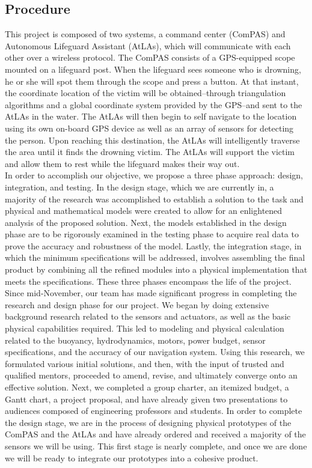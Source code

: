 \documentclass[11pt]{article}
\begin{document}
\subsection*{Procedure}
This project is composed of two systems, a command center (ComPAS) and Autonomous Lifeguard Assistant (AtLAs), which will communicate with each other over a wireless protocol. The ComPAS consists of a GPS-equipped scope mounted on a lifeguard post. When the lifeguard sees someone who is drowning, he or she will spot them through the scope and press a button. At that instant, the coordinate location of the victim will be obtained--through triangulation algorithms and a global coordinate system provided by the GPS--and sent to the AtLAs in the water. The AtLAs will then begin to self navigate to the location using its own on-board GPS device as well as an array of sensors for detecting the person. Upon reaching this destination, the AtLAs will intelligently traverse the area until it finds the drowning victim. The AtLAs will support the victim and allow them to rest while the lifeguard makes their way out.\\

In order to accomplish our objective, we propose a three phase approach: design, integration, and testing. In the design stage, which we are currently in, a majority of the research was accomplished to establish a solution to the task and physical and mathematical models were created to allow for an enlightened analysis of the proposed solution. Next, the models established in the design phase are to be rigorously examined in the testing phase to acquire real data to prove the accuracy and robustness of the model. Lastly, the integration stage, in which the minimum specifications will be addressed, involves assembling the final product by combining all the refined modules into a physical implementation that meets the specifications. These three phases encompass the life of the project. \\

Since mid-November, our team has made significant progress in completing the research and design phase for our project. We began by doing extensive background research related to the sensors and actuators, as well as the basic physical capabilities required. This led to modeling and physical calculation related to the buoyancy, hydrodynamics, motors, power budget, sensor specifications, and the accuracy of our navigation system. Using this research, we formulated various initial solutions, and then, with the input of trusted and qualified mentors, proceeded to amend, revise, and ultimately converge onto an effective solution. Next, we completed a group charter, an itemized budget, a Gantt chart, a project proposal, and have already given two presentations to audiences composed of engineering professors and students. In order to complete the design stage, we are in the process of designing physical prototypes of the ComPAS and the AtLAs and have already ordered and received a majority of the sensors we will be using. This first stage is nearly complete, and once we are done we will be ready to integrate our prototypes into a cohesive product.\\
\end{document}
